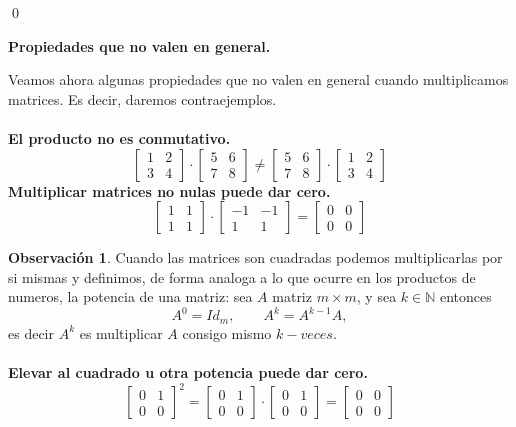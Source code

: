 \documentclass{article}
\theoremstyle{definition}
\theoremstyle{definition}
\newtheorem*{obs}{Observación}
\theoremstyle{remark}
\begin{document}
\qed
\begin{center}
\textbf{Propiedades que no valen en general.}
\end{center}
Veamos ahora algunas propiedades que no valen en general cuando multiplicamos matrices. Es decir, daremos contraejemplos.\\\\
\textbf{El producto no es conmutativo.}
\[
  \begin{bmatrix} 1 & 2 \\ 3 & 4 \end{bmatrix} \cdot \begin{bmatrix}5 & 6 \\ 7 & 8 \end{bmatrix} \neq \begin{bmatrix}5 & 6 \\ 7 & 8 \end{bmatrix} \cdot \begin{bmatrix}1 & 2 \\ 3 & 4 \end{bmatrix}
\]
\textbf{Multiplicar matrices no nulas puede dar cero.}
\[
  \begin{bmatrix}1 & 1 \\ 1 & 1 \end{bmatrix} \cdot \begin{bmatrix}-1 & -1 \\ 1 & 1 \end{bmatrix} = \begin{bmatrix}0 & 0 \\ 0 & 0 \end{bmatrix}
\]
\begin{obs}
Cuando las matrices son cuadradas podemos multiplicarlas por si mismas y definimos, de forma analoga a lo que ocurre en los productos de numeros, la potencia de una matriz: sea $A$ matriz $m \times m$, y sea $k \in \mathbb{N}$ entonces \[
  A^0=Id_m, \quad \quad A^k = A^{k-1} A,
\]
es decir $A^k$ es multiplicar $A$ consigo mismo $k-veces$.\\\\
\textbf{Elevar al cuadrado u otra potencia puede dar cero.}\[
  \begin{bmatrix} 0 & 1 \\ 0 & 0  \end{bmatrix}^2 =  \begin{bmatrix} 0 & 1 \\ 0 & 0  \end{bmatrix} \cdot  \begin{bmatrix} 0 & 1 \\ 0 & 0  \end{bmatrix} = \begin{bmatrix} 0 & 0 \\ 0 & 0 \end{bmatrix}
\]
\end{obs}
\end{document}
